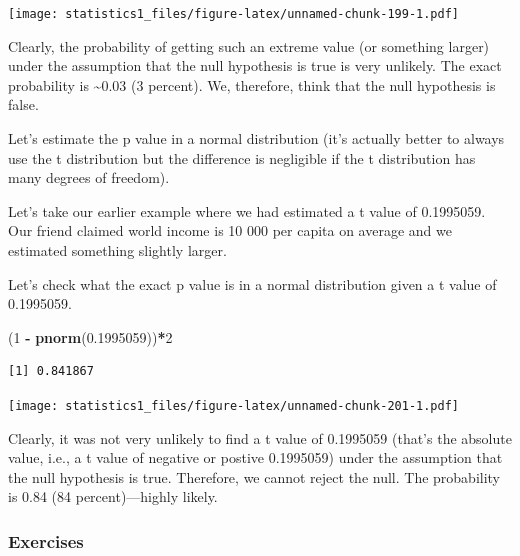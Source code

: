 \documentclass[]{article}
\newenvironment{Shaded}{\begin{snugshade}}{\end{snugshade}}
\newcommand{\KeywordTok}[1]{\textcolor[rgb]{0.13,0.29,0.53}{\textbf{#1}}}
\newcommand{\DecValTok}[1]{\textcolor[rgb]{0.00,0.00,0.81}{#1}}
\newcommand{\FloatTok}[1]{\textcolor[rgb]{0.00,0.00,0.81}{#1}}
\newcommand{\StringTok}[1]{\textcolor[rgb]{0.31,0.60,0.02}{#1}}
\newcommand{\OperatorTok}[1]{\textcolor[rgb]{0.81,0.36,0.00}{\textbf{#1}}}
\newcommand{\NormalTok}[1]{#1}
\theoremstyle{definition}
\theoremstyle{definition}
\theoremstyle{definition}
\theoremstyle{remark}
\begin{document}
\texttt{[image: statistics1\_files/figure-latex/unnamed-chunk-199-1.pdf]}

Clearly, the probability of getting such an extreme value (or something
larger) under the assumption that the null hypothesis is true is very
unlikely. The exact probability is \textasciitilde{}0.03 (3 percent).
We, therefore, think that the null hypothesis is false.

Let's estimate the p value in a normal distribution (it's actually
better to always use the t distribution but the difference is negligible
if the t distribution has many degrees of freedom).

Let's take our earlier example where we had estimated a t value of
0.1995059. Our friend claimed world income is 10 000 per capita on
average and we estimated something slightly larger.

Let's check what the exact p value is in a normal distribution given a t
value of 0.1995059.

\begin{Shaded}
\begin{Highlighting}[]
\NormalTok{(}\DecValTok{1} \OperatorTok{-}\StringTok{ }\KeywordTok{pnorm}\NormalTok{(}\FloatTok{0.1995059}\NormalTok{))}\OperatorTok{*}\DecValTok{2}
\end{Highlighting}
\end{Shaded}

\begin{verbatim}
[1] 0.841867
\end{verbatim}

\texttt{[image: statistics1\_files/figure-latex/unnamed-chunk-201-1.pdf]}

Clearly, it was not very unlikely to find a t value of 0.1995059 (that's
the absolute value, i.e., a t value of negative or postive 0.1995059)
under the assumption that the null hypothesis is true. Therefore, we
cannot reject the null. The probability is 0.84 (84 percent)---highly
likely.

\subsubsection{Exercises}\label{exercises-3}
\end{document}
